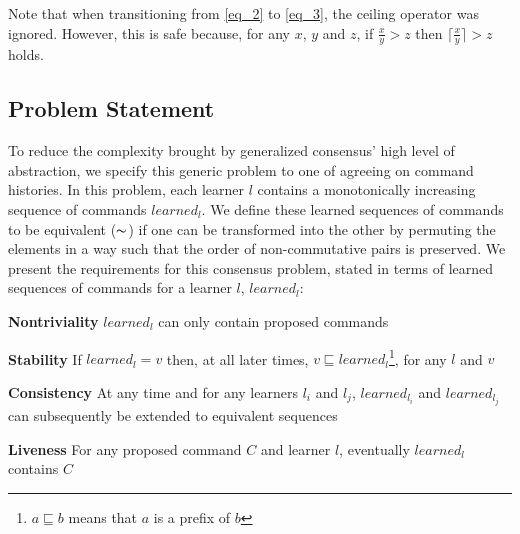Note that when transitioning from \eqref{eq_2} to \eqref{eq_3}, the ceiling operator was ignored. However, this is safe because, for any $x$, $y$ and $z$, if $\frac{x}{y} > z$ then $\lceil \frac{x}{y} \rceil > z$ holds.\par

\subsection{Problem Statement}
To reduce the complexity brought by generalized consensus' high level of abstraction, we specify this generic problem to one of agreeing on command histories. In this problem, each learner $l$ contains a monotonically increasing sequence of commands $learned_l$. We define these learned sequences of commands to be equivalent ($\thicksim$) if one can be transformed into the other by permuting the elements in a way such that the order of non-commutative pairs is preserved. We present the requirements for this consensus problem, stated in terms of learned sequences of commands for a learner $l$, $learned_l$:\par
\textbf{Nontriviality} $learned_l$ can only contain proposed commands \par
\textbf{Stability} If $learned_l = v$ then, at all later times, $v \sqsubseteq learned_l$\footnote{$a \sqsubseteq b$ means that $a$ is a prefix of $b$}, for any $l$ and $v$ \par
\textbf{Consistency} At any time and for any learners $l_i$ and $l_j$, $learned_{l_i}$ and $learned_{l_j}$ can subsequently be extended to equivalent sequences\par
\textbf{Liveness} For any proposed command $C$ and learner $l$, eventually $learned_l$ contains $C$ \par


